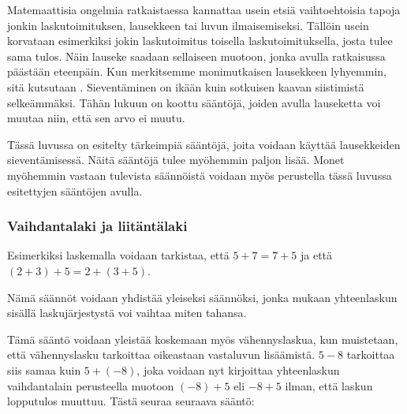 Matemaattisia ongelmia ratkaistaessa kannattaa usein etsiä vaihtoehtoisia tapoja jonkin laskutoimituksen, lausekkeen tai luvun ilmaisemiseksi. Tällöin usein korvataan esimerkiksi jokin laskutoimitus toisella laskutoimituksella, josta tulee sama tulos. Näin lauseke saadaan sellaiseen muotoon, jonka avulla ratkaisussa päästään eteenpäin. Kun merkitsemme monimutkaisen lausekkeen lyhyemmin, sitä kutsutaan . Sieventäminen on ikään kuin sotkuisen kaavan siistimistä selkeämmäksi. Tähän lukuun on koottu sääntöjä, joiden avulla lauseketta voi muutaa niin, että sen arvo ei muutu.

Tässä luvussa on esitelty tärkeimpiä sääntöjä, joita voidaan käyttää lausekkeiden sieventämisessä. Näitä sääntöjä tulee myöhemmin paljon lisää. Monet myöhemmin vastaan tulevista säännöistä voidaan myös perustella tässä luvussa esitettyjen sääntöjen avulla.

\subsubsection*{Vaihdantalaki ja liitäntälaki}


Esimerkiksi laskemalla voidaan tarkistaa, että $5+7=7+5$ ja että $(2+3)+5=2+(3+5)$.

Nämä säännöt voidaan yhdistää yleiseksi säännöksi, jonka mukaan yhteenlaskun sisällä laskujärjestystä voi vaihtaa miten tahansa.

Tämä sääntö voidaan yleistää koskemaan myös vähennyslaskua, kun muistetaan, että vähennyslasku tarkoittaa oikeastaan vastaluvun lisäämistä. $5-8$ tarkoittaa siis samaa kuin $5+(-8)$, joka voidaan nyt kirjoittaa yhteenlaskun vaihdantalain perusteella muotoon $(-8)+5$ eli $-8+5$ ilman, että laskun lopputulos muuttuu. Tästä seuraa seuraava sääntö:



